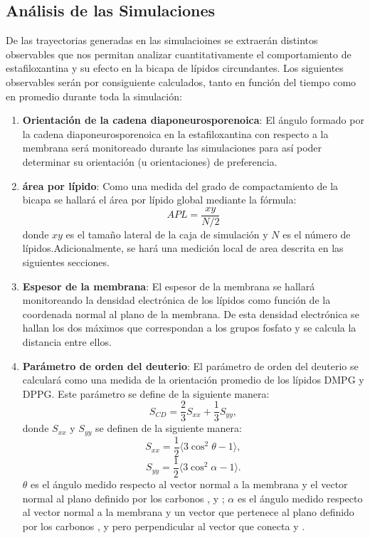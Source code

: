 \subsection*{An\'{a}lisis de las Simulaciones}
De las trayectorias generadas en las simulacioines se extraer\'{a}n distintos observables que nos permitan analizar cuantitativamente el comportamiento de estafiloxantina y su efecto en la bicapa de l\'{i}pidos circundantes. Los siguientes observables ser\'{a}n por consiguiente calculados, tanto en funci\'{o}n del tiempo como en promedio durante toda la simulaci\'{o}n:\\
\begin{enumerate}
\item \textbf{Orientaci\'{o}n de la cadena diaponeurosporenoica}: El \'{a}ngulo formado por la cadena diaponeurosporenoica en la estafiloxantina con respecto a la membrana ser\'{a} monitoreado durante las simulaciones para as\'{i} poder determinar su orientaci\'{o}n (u orientaciones) de preferencia.
\item \textbf{\'{a}rea por l\'{i}pido}: Como una medida del grado de compactamiento de la bicapa se hallar\'{a} el \'{a}rea por l\'{i}pido global mediante la f\'{o}rmula:
\begin{equation}
APL=\frac{xy}{N/2}
\end{equation}
donde $xy$ es el tamaño lateral de la caja de simulaci\'{o}n y $N$ es el n\'{u}mero de l\'{i}pidos.Adicionalmente, se har\'{a} una medici\'{o}n local de area descrita en las siguientes secciones.
\item \textbf{Espesor de la membrana}:
El espesor de la membrana se hallar\'{a} monitoreando la densidad electr\'{o}nica de los l\'{i}pidos como funci\'{o}n de la coordenada normal al plano de la membrana. De esta densidad electr\'{o}nica se hallan los dos m\'{a}ximos que correspondan a los grupos fosfato y se calcula la distancia entre ellos.
\item  \textbf{Par\'{a}metro de orden del deuterio}:
El par\'{a}metro de orden del deuterio se calcular\'{a} como una medida de la orientaci\'{o}n promedio de los l\'{i}pidos DMPG y DPPG. Este par\'{a}metro se define de la siguiente manera: \cite{Aponte-santamariaSupplementaryFigures}\\
\begin{equation}
S_{CD}=\frac{2}{3}S_{xx}+\frac{1}{3}S_{yy},
 \end{equation}
donde $S_{xx}$ y $S_{yy}$ se definen de la siguiente manera:
\begin{equation}
S_{xx}=\frac{1}{2}\langle 3\cos^2\theta-1\rangle,
 \end{equation}
\begin{equation}
S_{yy}=\frac{1}{2}\langle 3\cos^2\alpha-1\rangle.
 \end{equation}
$\theta$ es el \'{a}ngulo medido respecto al vector normal a la membrana y el vector normal al plano definido por los carbonos ,  y ; $\alpha$ es el \'{a}ngulo medido respecto al vector normal a la membrana y un vector que pertenece al plano definido por los carbonos ,  y  pero perpendicular al vector que conecta   y .


\end{enumerate}
